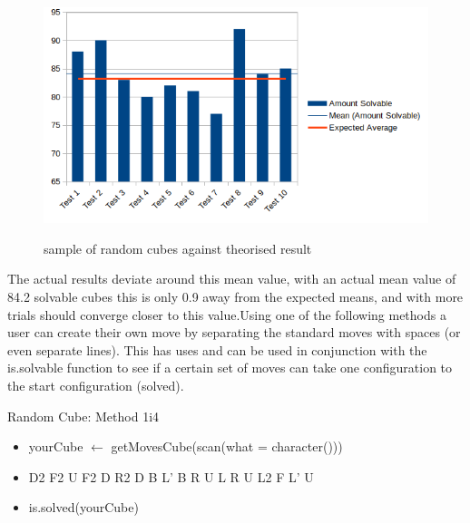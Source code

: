\documentclass{article}
\newcounter{theo}[section]\setcounter{theo}{0}
\begin{document}
\begin{figure}
\includegraphics[scale=.8]{randomcube.png}
\label{fig:randomresult}
\caption{sample of random cubes against theorised result}
\end{figure}The actual results deviate around this mean value, with an actual mean value of 84.2 solvable cubes this is only 0.9 away from the expected means, and with more trials should converge closer to this value.\newline Using one of the following methods a user can create their own move by separating the standard moves with spaces (or even separate lines). This has uses and can be used in conjunction with the is.solvable function to see if a certain set of moves can take one configuration to the start configuration (solved).
%




\begin{myinput}{Random Cube: Method 1}{i4}
\begin{itemize}
\item yourCube $\leftarrow$ getMovesCube(scan(what = character()))
\item  D2 F2 U F2 D R2 D B L' B R U L R U L2 F L' U
\item is.solved(yourCube)
\end{itemize}
\end{myinput}
\end{document}
